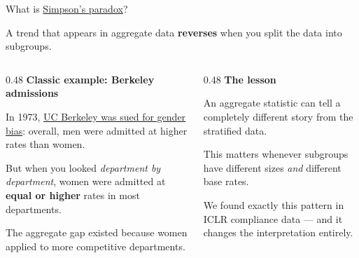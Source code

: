 \documentclass[aspectratio=169,11pt]{beamer}
\begin{document}
\begin{frame}{What is \href{https://en.wikipedia.org/wiki/Simpson\%27s_paradox}{Simpson's paradox}?}

A trend that appears in aggregate data \textbf{reverses} when you split the data into subgroups.

\vspace{0.5em}

\begin{columns}[T]
\begin{column}{0.48\textwidth}
\textbf{Classic example: Berkeley admissions}

\vspace{0.3em}
{\small In 1973, \href{https://en.wikipedia.org/wiki/Simpson\%27s_paradox\#UC_Berkeley_gender_bias}{UC Berkeley was sued for gender bias}: overall, men were admitted at higher rates than women.}

\vspace{0.3em}
{\small But when you looked \emph{department by department}, women were admitted at \textbf{equal or higher} rates in most departments.}

\vspace{0.3em}
{\small The aggregate gap existed because women applied to more competitive departments.}
\end{column}
\begin{column}{0.48\textwidth}
\textbf{The lesson}

\vspace{0.3em}
{\small An aggregate statistic can tell a completely different story from the stratified data.}

\vspace{0.5em}
{\small This matters whenever subgroups have different sizes \emph{and} different base rates.}

\vspace{0.5em}
{\small We found exactly this pattern in ICLR compliance data --- and it changes the interpretation entirely.}
\end{column}
\end{columns}
\end{frame}
\end{document}
